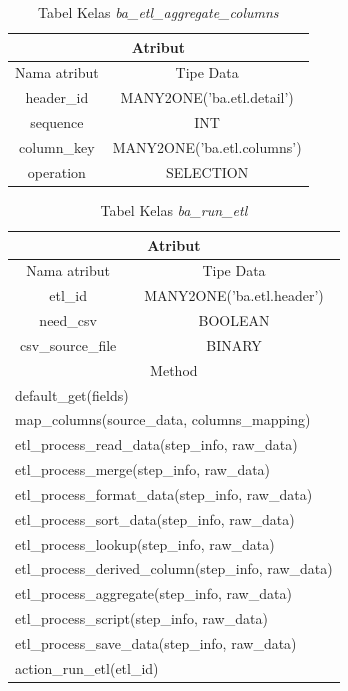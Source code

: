 \begin{table}[H]
	\centering
		\caption{Tabel Kelas \textit{ba\_etl\_aggregate\_columns}}
		\begin{tabular}{ | c | c|}
			\hline
				\multicolumn{2}{|c|}{Atribut}\\ \hline 
				Nama atribut & Tipe Data\\ \hline
				header\_id & MANY2ONE('ba.etl.detail')\\ \hline
				sequence & INT\\ \hline
				column\_key & MANY2ONE('ba.etl.columns')\\ \hline
				operation & SELECTION\\ \hline
		\end{tabular}
\end{table}

\begin{table}[H]
	\centering
		\caption{Tabel Kelas \textit{ba\_run\_etl}}
		\begin{tabular}{ | c | c|}
			\hline
				\multicolumn{2}{|c|}{Atribut}\\ \hline 
				Nama atribut & Tipe Data\\ \hline
				etl\_id & MANY2ONE('ba.etl.header')\\ \hline
				need\_csv & BOOLEAN\\ \hline
				csv\_source\_file & BINARY\\ \hline
				\multicolumn{2}{|c|}{Method}\\ \hline
				\multicolumn{2}{|l|}{default\_get(fields)}\\ \hline
				\multicolumn{2}{|l|}{map\_columns(source\_data, columns\_mapping)}\\ \hline
				\multicolumn{2}{|l|}{etl\_process\_read\_data(step\_info, raw\_data)}\\ \hline
				\multicolumn{2}{|l|}{etl\_process\_merge(step\_info, raw\_data)}\\ \hline
				\multicolumn{2}{|l|}{etl\_process\_format\_data(step\_info, raw\_data)}\\ \hline
				\multicolumn{2}{|l|}{etl\_process\_sort\_data(step\_info, raw\_data)}\\ \hline
				\multicolumn{2}{|l|}{etl\_process\_lookup(step\_info, raw\_data)}\\ \hline
				\multicolumn{2}{|l|}{etl\_process\_derived\_column(step\_info, raw\_data)}\\ \hline
				\multicolumn{2}{|l|}{etl\_process\_aggregate(step\_info, raw\_data)}\\ \hline
				\multicolumn{2}{|l|}{etl\_process\_script(step\_info, raw\_data)}\\ \hline
				\multicolumn{2}{|l|}{etl\_process\_save\_data(step\_info, raw\_data)}\\ \hline
				\multicolumn{2}{|l|}{action\_run\_etl(etl\_id)}\\ \hline
		\end{tabular}
\end{table}
